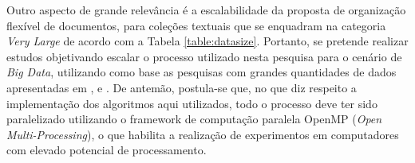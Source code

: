 Outro aspecto de grande relevância é a escalabilidade da proposta de organização flexível de
documentos, para coleções textuais que se enquadram na categoria {\it Very Large\/} de acordo com a
Tabela \ref{table:datasize}. Portanto, se pretende realizar estudos objetivando escalar o processo
utilizado nesta pesquisa para o cenário de {\it Big Data\/}, utilizando como base as pesquisas com
grandes quantidades de dados apresentadas em ,  e
. De antemão, postula-se que, no que diz respeito a implementação dos algoritmos
aqui utilizados, todo o processo deve ter sido paralelizado utilizando o framework de computação paralela
OpenMP ({\it Open Multi-Processing\/})\footnotemark, o que habilita a realização de experimentos em
computadores com elevado potencial de processamento.

